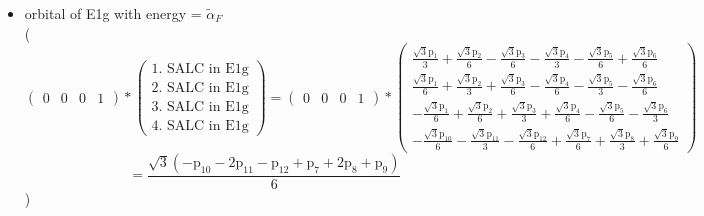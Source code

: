 \documentclass[12pt,a4paper]{article}
\begin{document}
\begin{itemize}
\textcolor{red}{Error in Orthogonalization of SALCs}\textcolor{red}{Error in Orthogonalization of SALCs}\textcolor{red}{Error in Orthogonalization of SALCs}\item orbital of E1g with energy = 
                                $\tilde{\alpha}_{F}$ \\
( 
$$
\begin{pmatrix}0 & 0 & 0 & 1\end{pmatrix} * \left(\begin{array}{c}\text{1. SALC in E1g} \\ \text{2. SALC in E1g} \\ \text{3. SALC in E1g} \\ \text{4. SALC in E1g}\end{array}\right) = \begin{pmatrix}0 & 0 & 0 & 1\end{pmatrix} * \begin{pmatrix}\frac{\sqrt{3} \text{p}_{1}}{3} + \frac{\sqrt{3} \text{p}_{2}}{6} - \frac{\sqrt{3} \text{p}_{3}}{6} - \frac{\sqrt{3} \text{p}_{4}}{3} - \frac{\sqrt{3} \text{p}_{5}}{6} + \frac{\sqrt{3} \text{p}_{6}}{6}\\\frac{\sqrt{3} \text{p}_{1}}{6} + \frac{\sqrt{3} \text{p}_{2}}{3} + \frac{\sqrt{3} \text{p}_{3}}{6} - \frac{\sqrt{3} \text{p}_{4}}{6} - \frac{\sqrt{3} \text{p}_{5}}{3} - \frac{\sqrt{3} \text{p}_{6}}{6}\\- \frac{\sqrt{3} \text{p}_{1}}{6} + \frac{\sqrt{3} \text{p}_{2}}{6} + \frac{\sqrt{3} \text{p}_{3}}{3} + \frac{\sqrt{3} \text{p}_{4}}{6} - \frac{\sqrt{3} \text{p}_{5}}{6} - \frac{\sqrt{3} \text{p}_{6}}{3}\\- \frac{\sqrt{3} \text{p}_{10}}{6} - \frac{\sqrt{3} \text{p}_{11}}{3} - \frac{\sqrt{3} \text{p}_{12}}{6} + \frac{\sqrt{3} \text{p}_{7}}{6} + \frac{\sqrt{3} \text{p}_{8}}{3} + \frac{\sqrt{3} \text{p}_{9}}{6}\end{pmatrix} 
 $$ $$ = \frac{\sqrt{3} \left(- \text{p}_{10} - 2 \text{p}_{11} - \text{p}_{12} + \text{p}_{7} + 2 \text{p}_{8} + \text{p}_{9}\right)}{6} 
 $$ 
 )


\end{itemize}
\end{document}
